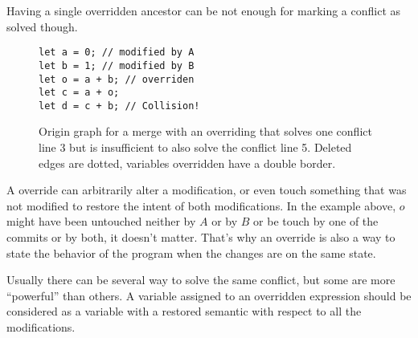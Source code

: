 \documentclass[a4paper,10pt]{article}
\begin{document}
Having a single overridden ancestor can be not enough for marking a conflict as solved though.

\begin{figure}[ht]
\begin{minipage}{.5\textwidth}
\begin{lstlisting}
let a = 0; // modified by A
let b = 1; // modified by B
let o = a + b; // overriden
let c = a + o;
let d = c + b; // Collision!
\end{lstlisting}
\end{minipage}\hfill
\begin{minipage}{.45\textwidth}
\centering{}
\end{minipage}
\caption{Origin graph for a merge with an overriding that solves one conflict line 3 but is insufficient to also solve the conflict line 5. Deleted edges are dotted, variables overridden have a double border.}
\end{figure}

A override can arbitrarily alter a modification, or even touch something that was not modified to restore the intent of both modifications. In the example above, $o$ might have been untouched neither by $A$ or by $B$ or be touch by one of the commits or by both, it doesn't matter. That's why an override is also a way to state the behavior of the program when the changes are on the same state.

Usually there can be several way to solve the same conflict, but some are more ``powerful'' than others. A variable assigned to an overridden expression should be considered as a variable with a restored semantic with respect to all the modifications.
\end{document}
